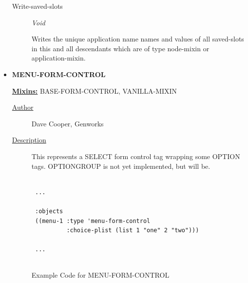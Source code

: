 \documentclass [11pt]{book}
\begin{document}
\begin{itemize}
\begin{description}
\item [Write-saved-slots]
\emph{Void}

 Writes the unique application name names and values of all saved-slots in this and all
descendants which are of type node-mixin or application-mixin.





\end{description}







\item {}
\label{prim:menu-form-control}
\textbf{MENU-FORM-CONTROL}


\textbf{
\underline{Mixins:}} BASE-FORM-CONTROL, VANILLA-MIXIN





\begin{description}

\item [
\underline{Author}]


Dave Cooper, Genworks



\item [
\underline{Description}]


This represents a SELECT form control tag wrapping some OPTION tags.
OPTIONGROUP is not yet implemented, but will be.



\end{description}




\begin{figure}
\begin{lrbox}{\boxedverb}
\begin{minipage}{\linewidth}
{\small

\begin{verbatim}

 ...
 
 :objects
 ((menu-1 :type 'menu-form-control
          :choice-plist (list 1 "one" 2 "two")))

 ...


\end{verbatim}}
\end{minipage}
\end{lrbox}
\fbox{\usebox{\boxedverb}}

\caption{Example Code for MENU-FORM-CONTROL}


\end{figure}
\end{itemize}
\end{document}
